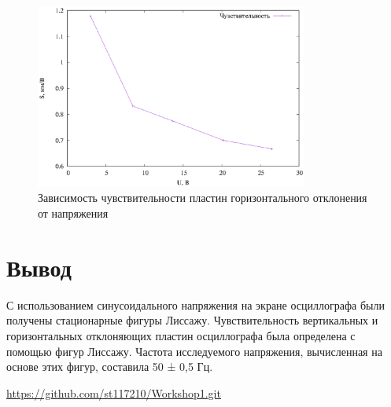 \begin{figure}[ht!]
\centering
\includegraphics[width=0.8\textwidth]{sensitivity_vs_voltage_H.eps}
\caption{Зависимость чувствительности пластин горизонтального отклонения от напряжения}
\label{fig:plot}
\end{figure}

\section{Вывод}
 С использованием синусоидального напряжения на экране осциллографа были получены стационарные фигуры Лиссажу. Чувствительность вертикальных и горизонтальных отклоняющих пластин осциллографа была определена с помощью фигур Лиссажу. Частота исследуемого напряжения, вычисленная на основе этих фигур, составила 50 ± 0,5 Гц.

\begin{thebibliography}{9}

\url{https://github.com/st117210/Workshop1.git}  


\end{thebibliography}
\clearpage
\appendix